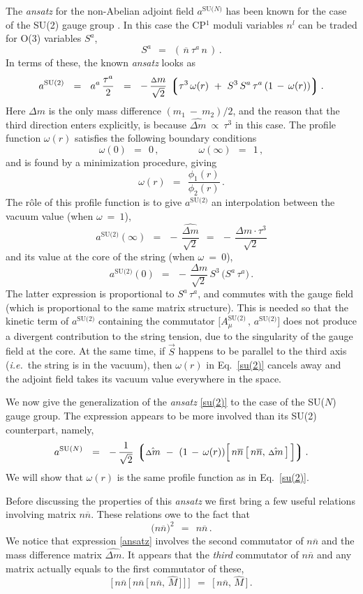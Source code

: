 \documentclass[12pt]{article}
\def\beq{\begin{equation}}
\def\eeq{\end{equation}}
\newcommand{\ov}{\overline}
\newcommand{\lgr}{\left\lgroup}
\newcommand{\rgr}{\right\rgroup}
\newcommand{\aN}{a^\text{SU($N$)}}
\newcommand{\nbar}{\ov{n}}
\newcommand{\nnbar}{n\ov{n}}
\newcommand{\dm}{\hat{{\scriptstyle \Delta} m}}
\newcommand{\deltam}{{\scriptstyle \Delta} m}
\newcommand{\ie}{{\it i.e.}~}
\newcommand{\ansatz}{{\it ansatz} }
\begin{document}
	The \ansatz for the non-Abelian adjoint field $ \aN $ has been known for the case
	of the SU(2) gauge group \cite{SYmon}.
	In this case the CP$^1$ moduli variables $ n^l $ can be traded for O(3) variables $ S^a $,
\beq
\label{S}
	S^a    ~~=~~    (\, \nbar\: \tau^a\, n \,)\,.
\eeq
	In terms of these, the known \ansatz looks as
\beq
\label{su(2)}
	a^\text{SU(2)}    ~~=~~
	a^a\, \frac{\tau^a}{2}    ~~=~~    -\, \frac{\deltam}{\sqrt{2}}\, 
		\lgr  \tau^3\, \omega(r)  ~+~  S^3\, S^a\,\tau^a\, (1 \,-\, \omega(r))  \rgr.
\eeq
	Here $ \deltam $ is the only mass difference $ (m_1 ~-~ m_2)/2 $, and the reason
	that the third direction enters explicitly, is because $ \dm ~\propto~ \tau^3 $ in this case.
	The profile function $ \omega(r) $ satisfies the following boundary conditions
\beq
	\omega(0)    ~~=~~    0\,,
	\qquad\qquad
	\omega(\infty)    ~~=~~    1\,,
\eeq
	and is found by a minimization procedure, giving
\beq
	\omega(r)    ~~=~~    \frac{\phi_1(r)}{\phi_2(r)}\,.
\eeq
	The r\^ole of this profile function is to give $ a^\text{SU(2)} $ an interpolation
	between the vacuum value (when $ \omega ~=~ 1 $),
\beq
	a^\text{SU(2)}(\infty)    ~~=~~    -\, \frac{\dm}{\sqrt{2}}    ~~=~~    -\, \frac{\deltam \cdot \tau^3}{\sqrt{2}}
\eeq
	and its value at the core of the string (when $ \omega ~=~ 0 $),
\beq
	a^\text{SU(2)}(0)    ~~=~~    -\, \frac{\deltam}{\sqrt{2}}\, S^3\, \big( S^a\, \tau^a \big)\,.
\eeq
	The latter expression is proportional to $ S^a\, \tau^a $, and commutes with the gauge field
	(which is proportional to the same matrix structure).
	This is needed so that the kinetic term of $ a^\text{SU(2)} $ containing the
	commutator $ \Big[ A^\text{SU(2)}_\mu \,,\, a^\text{SU(2)} \Big] $ does not produce 
	a divergent contribution to the string tension, due to the singularity of the gauge field at the core.
	At the same time, if $ \vec{S} $ happens to be parallel to the third axis (\ie the string is in the vacuum),
	then $ \omega(r) $ in Eq.~\eqref{su(2)} cancels away and the adjoint field takes its vacuum value everywhere in the space.

	We now give the generalization of the \ansatz \eqref{su(2)} to the case
	of the SU($N$) gauge group.
	The expression appears to be more involved than its SU(2) counterpart, namely,
\beq
\label{ansatz}
	\aN    ~~=~~    
	-\, \frac{1}{\sqrt{2}}\, 
	\lgr \dm  ~-~  (1 \,-\, \omega(r)) \Big[\, \nnbar\, \big[\, \nnbar,\, \dm \,\big] \,\Big] \rgr.
\eeq
	We will show that $ \omega(r) $ is the same profile function as in Eq.~\eqref{su(2)}.

	Before discussing the properties of this \ansatz we first bring a few useful relations
	involving matrix $ \nnbar $.
	These relations owe to the fact that 
\beq
\label{nnbarsq}
	\big( \nnbar \big)^2 ~~=~~ \nnbar\,.
\eeq
	We notice that expression \eqref{ansatz} involves the second commutator of $ \nnbar $
	and the mass difference matrix $ \dm $.
	It appears that the \emph{third} commutator of $ \nnbar $ and any matrix actually
	equals to the first commutator of these,
\beq
\label{comm}
	\Big[\, \nnbar\, \Big[\, \nnbar\, \big[\, \nnbar,\, \hat{M} \,\big] \,\Big] \,\Big]    ~~=~~
	\big[\, \nnbar,\, \hat{M} \,\big]\,.
\eeq
\end{document}
